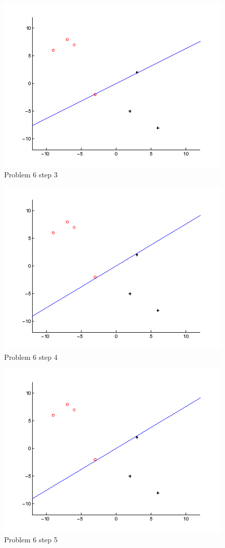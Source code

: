 \begin{figure}
\centering{}\includegraphics[width=1\textwidth]{plots/6_3}\caption{Problem 6 step 3}
\end{figure}
\begin{figure}
\centering{}\includegraphics[width=1\textwidth]{plots/6_4}\caption{Problem 6 step 4}
\end{figure}
\begin{figure}
\centering{}\includegraphics[width=1\textwidth]{plots/6_4}\caption{Problem 6 step 5}
\end{figure}

